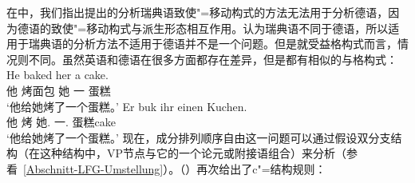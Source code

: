     在\citet{MWArgSt}中，我们指出\citet{ADT2008a,ADT2013a}提出的分析瑞典语致使"=移动构式的方法无法用于分析德语，因为德语的致使"=移动构式与派生形态相互作用。\citet{AT2014a}认为瑞典语不同于德语，所以适用于瑞典语的分析方法不适用于德语并不是一个问题。但是就受益格构式而言，情况则不同。虽然英语和德语在很多方面都存在差异，但是都有相似的与格构式：
\eal
\ex 
\gll He baked her a cake.\\
     他 烤面包 她 一 蛋糕\\
\glt `他给她烤了一个蛋糕。'
\ex
\label{ex-er-buk-ihr-einen-kuchen} 
\gll Er buk   ihr        einen Kuchen.\\
     他 烤 她.\dat{} 一.\acc{} 蛋糕cake\\
\glt `他给她烤了一个蛋糕。'
\zl
现在，成分排列顺序自由这一问题可以通过假设双分支结构（在这种结构中，VP节点与它的一个论元或附接语组合）来分析（参看~\ref{Abschnitt-LFG-Umstellung}）。（）再次给出了c"=结构规则：
